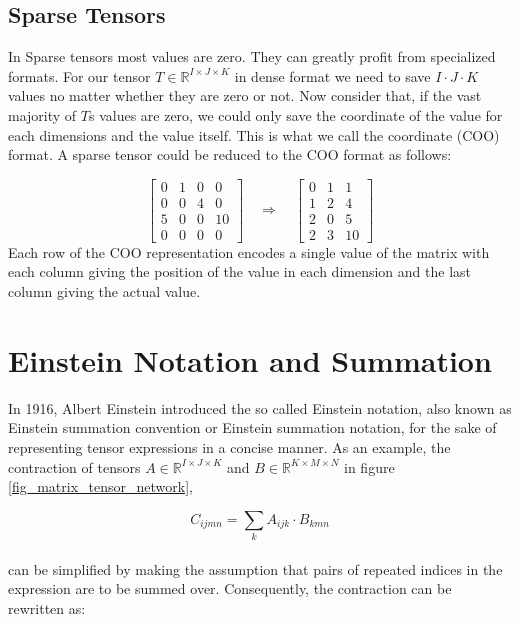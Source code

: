 \subsection{Sparse Tensors}
In Sparse tensors most values are zero. They can greatly profit from specialized
formats. For our tensor $T \in \mathbb{R}^{I \times J \times K}$ in dense format
we need to save $I \cdot J \cdot K$ values no matter whether they are zero or not.
Now consider that, if the vast majority of $T$s values are zero, we could only save
the coordinate of the value for each dimensions and the value itself. This is what
we call the coordinate (COO) format. A sparse tensor could be reduced to the COO
format as follows:

\begin{equation*}
    \begin{bmatrix}
    0 & 1 & 0 & 0 \\
    0 & 0 & 4 & 0 \\
    5 & 0 & 0 & 10 \\
    0 & 0 & 0 & 0
    \end{bmatrix}
    \quad
    \Rightarrow
    \quad
    \begin{bmatrix}
    0 & 1 & 1 \\
    1 & 2 & 4 \\
    2 & 0 & 5 \\
    2 & 3 & 10
    \end{bmatrix}
\end{equation*}
%
Each row of the COO representation encodes a single value of the matrix with each
column giving the position of the value in each dimension and the last column giving
the actual value.

\section{Einstein Notation and Summation}
In 1916, Albert Einstein introduced the so called Einstein notation, also known as
Einstein summation convention or Einstein summation notation, for the sake of
representing tensor expressions in a concise manner. As an example, the contraction of tensors
$A \in \mathbb{R}^{I \times J \times K}$ and $B \in \mathbb{R}^{K \times M \times N}$
in figure \ref{fig_matrix_tensor_network},

\[C_{ijmn} = \sum_{k}A_{ijk} \cdot B_{kmn}\]
\noindent
\\
can be simplified by making the assumption that pairs of repeated indices in the expression
are to be summed over. Consequently, the contraction can be rewritten as:

